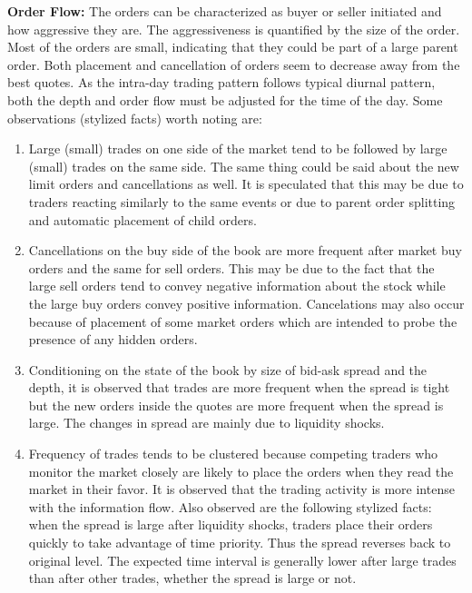 \noindent\textbf{Order Flow:} The orders can be characterized as buyer or seller initiated and how aggressive they are. The aggressiveness is quantified by the size of the order. Most of the orders are small, indicating that they could be part of a large parent order. Both placement and cancellation of orders seem to decrease away from the best quotes. As the intra-day trading pattern follows typical diurnal pattern, both the depth and order flow must be adjusted for the time of the day. Some observations (stylized facts) worth noting are:

\begin{enumerate}[--]
\item Large (small) trades on one side of the market tend to be followed by large (small) trades on the same side. The same thing could be said about the new limit orders and cancellations as well. It is speculated that this may be due to traders reacting similarly to the same events or due to parent order splitting and automatic placement of child orders. \twomedskip

\item Cancellations on the buy side of the book are more frequent after market buy orders and the same for sell orders. This may be due to the fact that the large sell orders tend to convey negative information about the stock while the large buy orders convey positive information. Cancelations may also occur because of placement of some market orders which are intended to probe the presence of any hidden orders. \twomedskip

\item Conditioning on the state of the book by size of bid-ask spread and the depth, it is observed that trades are more frequent when the spread is tight but the new orders inside the quotes are more frequent when the spread is large. The changes in spread are mainly due to liquidity shocks. \twomedskip

\item Frequency of trades tends to be clustered because competing traders who monitor the market closely are likely to place the orders when they read the market in their favor. It is observed that the trading activity is more intense with the information flow. Also observed are the following stylized facts: when the spread is large after liquidity shocks, traders place their orders quickly to take advantage of time priority. Thus the spread reverses back to original level. The expected time interval is generally lower after large trades than after other trades, whether the spread is large or not.
\end{enumerate}


